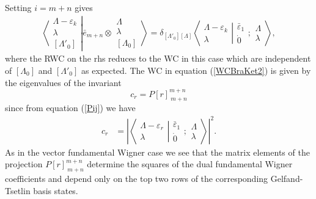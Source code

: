 \documentclass[12pt]{article}
\begin{document}
Setting $i=m+n$ gives
\begin{align}
\left\langle\left. 
\begin{array}{c} \Lambda-\varepsilon_k\\ \lambda \\ {[\Lambda'_0]} \end{array}
\right|\right.
\left.
\bar{e}_{m+n} \otimes \begin{array}{c} \Lambda \\ \lambda \\
{[\Lambda_0]} \end{array}
\right\rangle = \delta_{[\Lambda'_0][\Lambda]}
 \left\langle\left. 
\begin{array}{c} \Lambda-\varepsilon_k\\ \lambda \end{array}
\right|\right.
\left.
\begin{array}{c} 
\bar{\varepsilon}_1 \\ \dot{0}
\end{array}
;
\begin{array}{c} \Lambda \\
\lambda \end{array}
\right\rangle  , \label{WCBraKet2}
\end{align}
where the RWC on the rhs reduces to the WC in this case which are independent of $[\Lambda_0]$ and $[\Lambda'_0]$ as expected. 
The WC in equation (\ref{WCBraKet2}) is given by the eigenvalues of the invariant
$$ 
c_r = P[r]_{\ m+n}^{m+n}
$$
since from equation (\ref{Pij}) we have
\begin{align}
c_r &= \left| \left\langle\left. 
\begin{array}{c} \Lambda-\varepsilon_r\\ \lambda \end{array}
\right|\right.
\left.
\begin{array}{c} \bar{\varepsilon}_1 \\
\dot{0} \end{array}  ; \begin{array}{c} \Lambda \\
\lambda \end{array}
\right\rangle \right|^2. \label{WigCoefCUnbar}
\end{align}
As in the vector fundamental Wigner case we see that the matrix elements of the projection  $P[r]_{\ m+n}^{m+n}$ determine
the squares of the dual fundamental Wigner coefficients and depend only on the top two rows of the corresponding Gelfand-Tsetlin basis states.
\end{document}

